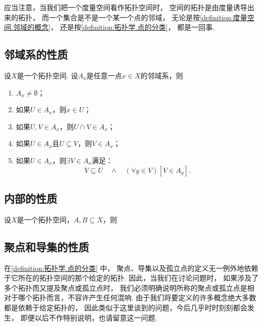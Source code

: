 \begin{remark}
应当注意，当我们把一个度量空间看作拓扑空间时，
空间的拓扑是由度量诱导出来的拓扑，
而一个集合是不是一个某一个点的邻域，
无论是按\cref{definition:度量空间.邻域的概念}，
还是按\cref{definition:拓扑学.点的分类}，
都是一回事.
\end{remark}

\subsection{邻域系的性质}
\begin{theorem}\label{theorem:拓扑学.邻域系的基本性质}
设\(X\)是一个拓扑空间.
设\(A_x\)是任意一点\(x \in X\)的邻域系，则
\begin{enumerate}
	\item \(A_x \neq \emptyset\)；
	\item 如果\(U \in A_x\)，则\(x \in U\)；
	\item 如果\(U,V \in A_x\)，则\(U \cap V \in A_x\)；
	\item 如果\(U \in A_x\)且\(U \subseteq V\)，则\(V \in A_x\)；
	\item 如果\(U \in A_x\)，则\(\exists V \in A_x\)满足：\[
		V \subseteq U
		\quad\land\quad
		(\forall y \in V)
		[V \in A_y].
	\]
\end{enumerate}
\end{theorem}

\subsection{内部的性质}
\begin{property}
设\(X\)是一个拓扑空间，\(A,B \subseteq X\)，则
\end{property}

\subsection{聚点和导集的性质}
在\cref{definition:拓扑学.点的分类} 中，
聚点、导集以及孤立点的定义无一例外地依赖于它所在的拓扑空间的那个给定的拓扑.
因此，当我们在讨论问题时，
如果涉及了多个拓扑而又提及聚点或孤立点时，
我们必须明确说明所称的聚点或孤立点是相对于哪个拓扑而言，不容许产生任何混响.
由于我们将要定义的许多概念绝大多数都是依赖于给定拓扑的，
因此类似于这里谈到的问题，今后几乎时时刻刻都会发生，
即便以后不作特别说明，也请留意这一问题.

